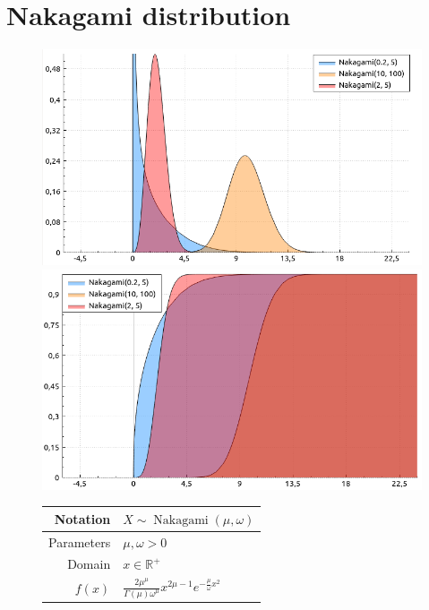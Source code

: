 \documentclass[a4paper,11pt]{article}
\theoremstyle{plain}
\theoremstyle{definition}
\newcommand{\MR}{\mathbb{R}}
\begin{document}
	
	\pagebreak
	\section{Nakagami distribution}
	\begin{figure}[!htb]\centering
		\begin{minipage}{0.55\textwidth}
			\includegraphics[width=\linewidth, right]{nakagami_pdf}
			\captionsetup{labelformat=empty}
			\includegraphics[width=\linewidth, right]{nakagami_cdf}
			\captionsetup{labelformat=empty}
		\end{minipage}
		\begin{minipage}{0.4\textwidth}
			\begin{tabular}{| r | l |}
				\hline
				Notation & $X \sim \operatorname{Nakagami}(\mu, \omega)$ \\
				\hline
				Parameters & $\mu, \omega > 0$ \\
				\hline
				Domain & $x \in \MR^+$  \\
				\hline
				$f(x)$ & $ \frac{2\mu^\mu}{\Gamma(\mu) \omega^\mu} x^{2\mu - 1} e^{-\frac{\mu}{\omega}x^2}   $ \\

\end{tabular}
\end{minipage}
\end{figure}
\end{document}
